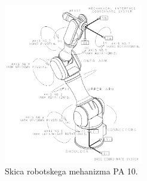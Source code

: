 \begin{figure}
	\centering
	\includegraphics[height=7cm]{./Slike/pa10-drawing.png}
	\caption{Skica robotskega mehanizma PA 10.}
	\label{fig:pa10drawing}
\end{figure}
